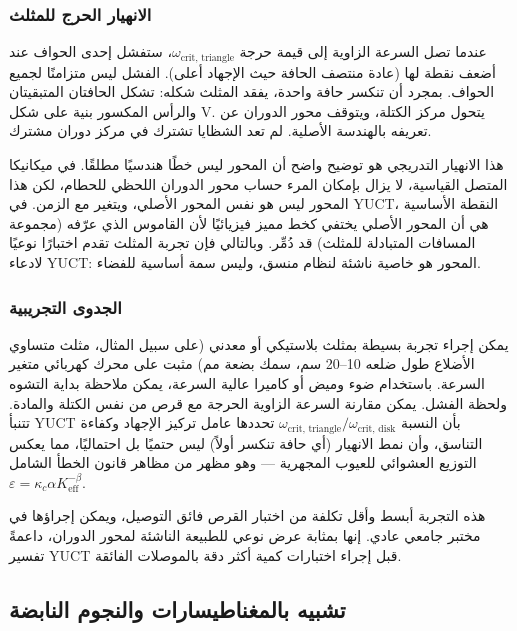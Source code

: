 \documentclass[12pt,a4paper]{article}
\begin{document}
	\subsubsection{الانهيار الحرج للمثلث}
	
	عندما تصل السرعة الزاوية إلى قيمة حرجة \(\omega_{\text{crit, triangle}}\)، ستفشل إحدى الحواف عند أضعف نقطة لها (عادة منتصف الحافة حيث الإجهاد أعلى). الفشل ليس متزامنًا لجميع الحواف. بمجرد أن تنكسر حافة واحدة، يفقد المثلث شكله: تشكل الحافتان المتبقيتان والرأس المكسور بنية على شكل V. يتحول مركز الكتلة، ويتوقف محور الدوران عن تعريفه بالهندسة الأصلية. لم تعد الشظايا تشترك في مركز دوران مشترك.
	
	هذا الانهيار التدريجي هو توضيح واضح أن المحور ليس خطًا هندسيًا مطلقًا. في ميكانيكا المتصل القياسية، لا يزال بإمكان المرء حساب محور الدوران اللحظي للحطام، لكن هذا المحور ليس هو نفس المحور الأصلي، ويتغير مع الزمن. في YUCT، النقطة الأساسية هي أن المحور الأصلي يختفي كخط مميز فيزيائيًا لأن القاموس الذي عرّفه (مجموعة المسافات المتبادلة للمثلث) قد دُمِّر. وبالتالي فإن تجربة المثلث تقدم اختبارًا نوعيًا لادعاء YUCT: المحور هو خاصية ناشئة لنظام منسق، وليس سمة أساسية للفضاء.
	
	\subsubsection{الجدوى التجريبية}
	
	يمكن إجراء تجربة بسيطة بمثلث بلاستيكي أو معدني (على سبيل المثال، مثلث متساوي الأضلاع طول ضلعه 10–20 سم، سمك بضعة مم) مثبت على محرك كهربائي متغير السرعة. باستخدام ضوء وميض أو كاميرا عالية السرعة، يمكن ملاحظة بداية التشوه ولحظة الفشل. يمكن مقارنة السرعة الزاوية الحرجة مع قرص من نفس الكتلة والمادة. تتنبأ YUCT بأن النسبة \(\omega_{\text{crit, triangle}} / \omega_{\text{crit, disk}}\) تحددها عامل تركيز الإجهاد وكفاءة التناسق، وأن نمط الانهيار (أي حافة تنكسر أولاً) ليس حتميًا بل احتماليًا، مما يعكس التوزيع العشوائي للعيوب المجهرية — وهو مظهر من مظاهر قانون الخطأ الشامل \(\varepsilon = \kappa_c \alpha K_{\mathrm{eff}}^{-\beta}\).
	
	هذه التجربة أبسط وأقل تكلفة من اختبار القرص فائق التوصيل، ويمكن إجراؤها في مختبر جامعي عادي. إنها بمثابة عرض نوعي للطبيعة الناشئة لمحور الدوران، داعمةً تفسير YUCT قبل إجراء اختبارات كمية أكثر دقة بالموصلات الفائقة.
	
	\subsection{تشبيه بالمغناطيسارات والنجوم النابضة}
	
\end{document}
